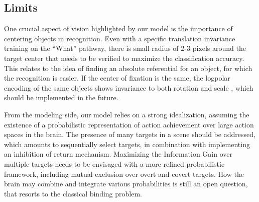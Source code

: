 \subsection{Limits}



One crucial aspect of vision highlighted by our model is the importance of centering objects in recognition. Even with a specific translation invariance training on the ``What'' pathway, there is small radius of 2-3 pixels around the target center that needs to be verified to maximize the classification accuracy. This relates to the idea of finding an absolute referential for an object, for which the recognition is easier. If the center of fixation is the same, the logpolar encoding of the same objects shows invariance to both rotation and scale \citep{Traver10}, which should be implemented in the future.


From the modeling side, our model relies on a strong idealization, assuming the existence of a probabilistic representation of action achievement over large action spaces in the brain. 
The presence of many targets in a scene should be addressed, which amounts to sequentially select targets, in combination with implementing an inhibition of return mechanism. Maximizing the Information Gain over multiple targets needs to be envisaged with a more refined probabilistic framework, including mutual exclusion over overt and covert targets.
How the brain may combine and integrate various probabilities is still an open question, that resorts to the classical binding problem. %
